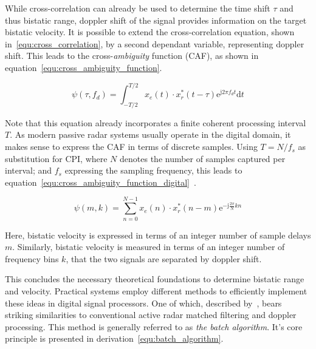 While cross-correlation can already be used to determine the time shift \(\tau\) and thus bistatic range, doppler shift of the signal provides information on the target bistatic velocity. It is possible to extend the cross-correlation equation, shown in~\ref{equ:cross_correlation}, by a second dependant variable, representing doppler shift. This leads to the cross-\emph{ambiguity} function (CAF), as shown in equation~\ref{equ:cross_ambiguity_function}.

\begin{equation}\label{equ:cross_ambiguity_function}
    \psi(\tau, f_{d}) = \int_{-T/2}^{T/2} {x_{e}(t) \cdot x_{r}^{*}} \left( t - \tau \right)\mathrm{e}^{\mathrm{j} 2 \pi f_{d} t} \mathrm{d} t
\end{equation}

Note that this equation already incorporates a finite coherent processing interval \(T\). As modern passive radar systems usually operate in the digital domain, it makes sense to express the CAF in terms of discrete samples. Using \(T = N / f_{s}\) as substitution for CPI, where \(N\) denotes the number of samples captured per interval; and \(f_{s}\) expressing the sampling frequency, this leads to equation~\ref{equ:cross_ambiguity_function_digital}~\cite[p.~134]{Malanowski2019}.

\begin{equation}\label{equ:cross_ambiguity_function_digital}
    \psi(m,k) = \sum_{n = 0}^{N - 1}{x_{e}(n) \cdot x_{r}^{*}(n - m) \mathrm{e}^{-\mathrm{j} \frac{2 \pi}{N} k n}}
\end{equation}

Here, bistatic velocity is expressed in terms of an integer number of sample delays \(m\). Similarly, bistatic velocity is measured in terms of an integer number of frequency bins \(k\), that the two signals are separated by doppler shift.

This concludes the necessary theoretical foundations to determine bistatic range and velocity. Practical systems employ different methods to efficiently implement these ideas in digital signal processors. One of which, described by~\cite[p.~138]{Malanowski2019}, bears striking similarities to conventional active radar matched filtering and doppler processing. This method is generally referred to as \emph{the batch algorithm}. It's core principle is presented in derivation~\ref{equ:batch_algorithm}.

